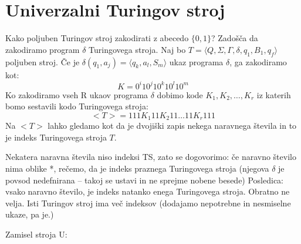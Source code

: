 \documentclass[10pt,a4paper,oneside]{book}
\begin{document}
\section{Univerzalni Turingov stroj}

Kako poljuben Turingov stroj zakodirati z abecedo $\{0,1\}$?
Zadošča da zakodiramo program $\delta$ Turingovega stroja.%
Naj bo $T=\langle Q,\Sigma,\Gamma,\delta,q_1,B_1,q_f \rangle$ poljuben stroj.%
Če je $\delta(q_1,a_j)=\langle q_k, a_l, S_m \rangle$ ukaz programa $\delta$, ga zakodiramo kot:
	\[ K=0^i 1 0^j 1 0^k 1 0^l 1 0^m\]
Ko zakodiramo vseh R ukaov programa $\delta$ dobimo kode $K_1, K_2, \dots, K_r$ iz katerih bomo sestavili kodo Turingovega stroja:
	\[ <T> = 111 K_1 11 K_2 11 \dots 11 K_r 111\]%
Na $<T>$ lahko gledamo kot da je dvojiški zapis nekega naravnega števila in to je indeks Turingovega stroja $T$.

Nekatera naravna števila niso indeksi TS, zato se dogovorimo: če naravno število nima oblike *, rečemo, da je indeks praznega Turingovega stroja (njegova $\delta$ je povsod nedefnirana -- takoj se ustavi in ne sprejme nobene besede)
Posledica: vsako naravno število, je indeks natanko enega Turingovega stroja.
Obratno ne velja. Isti Turingov stroj ima več indeksov (dodajamo nepotrebne in nesmiselne ukaze, pa je.)
%


Zamisel stroja U:

\end{document}
